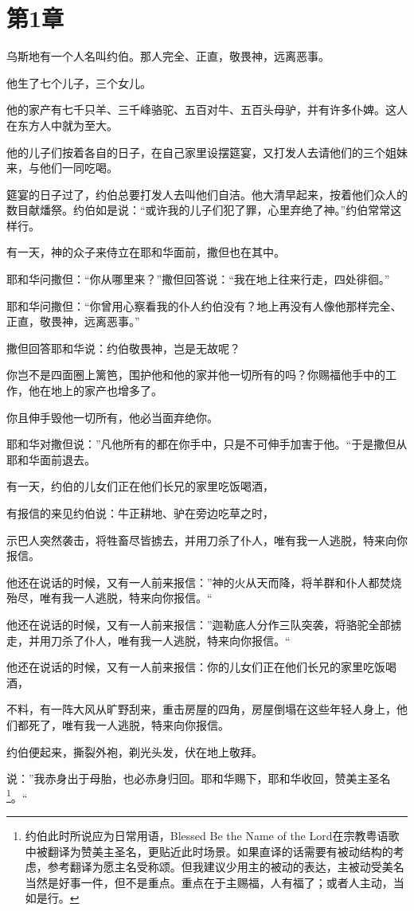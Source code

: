 \documentclass[12pt,oneside]{book}
\begin{document}
\chapter{第1章}
乌斯地有一个人名叫约伯。那人完全、正直，敬畏神，远离恶事。

他生了七个儿子，三个女儿。

他的家产有七千只羊、三千峰骆驼、五百对牛、五百头母驴，并有许多仆婢。这人在东方人中就为至大。

他的儿子们按着各自的日子，在自己家里设摆筵宴，又打发人去请他们的三个姐妹来，与他们一同吃喝。

筵宴的日子过了，约伯总要打发人去叫他们自洁。他大清早起来，按着他们众人的数目献燔祭。约伯如是说：“或许我的儿子们犯了罪，心里弃绝了神。”约伯常常这样行。

有一天，神的众子来侍立在耶和华面前，撒但也在其中。

耶和华问撒但：“你从哪里来？”撒但回答说：“我在地上往来行走，四处徘徊。”

耶和华问撒但：“你曾用心察看我的仆人约伯没有？地上再没有人像他那样完全、正直，敬畏神，远离恶事。”

撒但回答耶和华说：约伯敬畏神，岂是无故呢？

你岂不是四面圈上篱笆，围护他和他的家并他一切所有的吗？你赐福他手中的工作，他在地上的家产也增多了。

你且伸手毁他一切所有，他必当面弃绝你。

耶和华对撒但说：”凡他所有的都在你手中，只是不可伸手加害于他。“于是撒但从耶和华面前退去。

有一天，约伯的儿女们正在他们长兄的家里吃饭喝酒，

有报信的来见约伯说：牛正耕地、驴在旁边吃草之时，

示巴人突然袭击，将牲畜尽皆掳去，并用刀杀了仆人，唯有我一人逃脱，特来向你报信。

他还在说话的时候，又有一人前来报信：”神的火从天而降，将羊群和仆人都焚烧殆尽，唯有我一人逃脱，特来向你报信。“

他还在说话的时候，又有一人前来报信：”迦勒底人分作三队突袭，将骆驼全部掳走，并用刀杀了仆人，唯有我一人逃脱，特来向你报信。“

他还在说话的时候，又有一人前来报信：你的儿女们正在他们长兄的家里吃饭喝酒，

不料，有一阵大风从旷野刮来，重击房屋的四角，房屋倒塌在这些年轻人身上，他们都死了，唯有我一人逃脱，特来向你报信。

约伯便起来，撕裂外袍，剃光头发，伏在地上敬拜。

说：”我赤身出于母胎，也必赤身归回。耶和华赐下，耶和华收回，赞美主圣名\footnote{约伯此时所说应为日常用语，Blessed Be the Name of the Lord在宗教粤语歌中被翻译为赞美主圣名，更贴近此时场景。如果直译的话需要有被动结构的考虑，参考翻译为愿主名受称颂。但我建议少用主的被动的表达，主被动受美名当然是好事一件，但不是重点。重点在于主赐福，人有福了；或者人主动，当如是行。}。“
\end{document}
